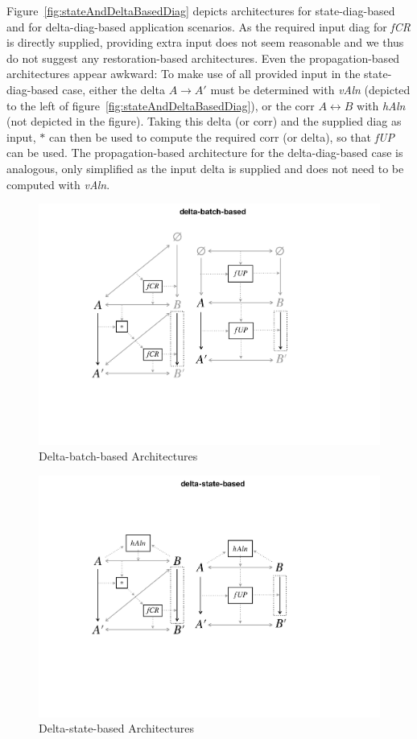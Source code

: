 Figure~\ref{fig:stateAndDeltaBasedDiag} depicts architectures for state-diag-based and for delta-diag-based application scenarios.
As the required input diag for \emph{fCR} is directly supplied, providing extra input does not seem reasonable and we thus do not suggest any restoration-based architectures.
Even the propagation-based architectures appear awkward:  To make use of all provided input in the state-diag-based case, either the delta $A \rightarrow A'$ must be determined with \emph{vAln} (depicted to the left of figure~\ref{fig:stateAndDeltaBasedDiag}), or the corr $A \leftrightarrow B$ with \emph{hAln} (not depicted in the figure).  
Taking this delta (or corr) and the supplied diag as input, $\ast$ can then be used to compute the required corr (or delta), so that \emph{fUP} can be used.
The propagation-based architecture for the delta-diag-based case is analogous, only simplified as the input delta is supplied and does not need to be computed with \emph{vAln}.

\begin{figure}[tb!]
	\centering
	\includegraphics[width=0.73\columnwidth]{diagrams/foundations/delta-batch-based}
	\caption{Delta-batch-based Architectures}
	\label{fig:deltaBatchBased}
\end{figure}

\begin{figure}[tb!]
	\centering
	\includegraphics[width=0.75\columnwidth]{diagrams/foundations/delta-state-based}
	\caption{Delta-state-based Architectures}
	\label{fig:deltaStateBased}
\end{figure}

